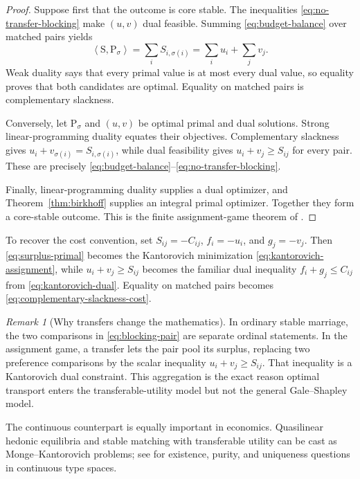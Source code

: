 \documentclass[11pt]{article}
\theoremstyle{definition}
\theoremstyle{remark}
\newtheorem{remark}[theorem]{Remark}
\newcommand{\Pmat}{\mathrm P}
\newcommand{\Smat}{\mathrm S}
\newcommand{\ip}[2]{\left\langle #1,#2\right\rangle}
\begin{document}
\begin{proof}
Suppose first that the outcome is core stable. The inequalities
\eqref{eq:no-transfer-blocking} make \((u,v)\) dual feasible. Summing
\eqref{eq:budget-balance} over matched pairs yields
\begin{equation}\label{eq:core-equal-values}
  \ip{\Smat}{\Pmat_\sigma}
  =\sum_i S_{i,\sigma(i)}
  =\sum_i u_i+\sum_jv_j.
\end{equation}
Weak duality says that every primal value is at most every dual value, so
equality proves that both candidates are optimal. Equality on matched pairs is
complementary slackness.

Conversely, let \(\Pmat_\sigma\) and \((u,v)\) be optimal primal and dual
solutions. Strong linear-programming duality equates their objectives.
Complementary slackness gives
\(u_i+v_{\sigma(i)}=S_{i,\sigma(i)}\), while dual feasibility gives
\(u_i+v_j\geq S_{ij}\) for every pair. These are precisely
\eqref{eq:budget-balance}--\eqref{eq:no-transfer-blocking}.

Finally, linear-programming duality supplies a dual optimizer, and
Theorem~\ref{thm:birkhoff} supplies an integral primal optimizer. Together they
form a core-stable outcome. This is the finite assignment-game theorem of
\citet{ShapleyShubik1971}.
\end{proof}

To recover the cost convention, set \(S_{ij}=-C_{ij}\), \(f_i=-u_i\), and
\(g_j=-v_j\). Then \eqref{eq:surplus-primal} becomes the Kantorovich
minimization \eqref{eq:kantorovich-assignment}, while
\(u_i+v_j\geq S_{ij}\) becomes the familiar dual inequality
\(f_i+g_j\leq C_{ij}\) from \eqref{eq:kantorovich-dual}. Equality on matched
pairs becomes \eqref{eq:complementary-slackness-cost}.

\begin{remark}[Why transfers change the mathematics]
In ordinary stable marriage, the two comparisons in
\eqref{eq:blocking-pair} are separate ordinal statements. In the assignment
game, a transfer lets the pair pool its surplus, replacing two preference
comparisons by the scalar inequality \(u_i+v_j\geq S_{ij}\). That inequality
is a Kantorovich dual constraint. This aggregation is the exact reason optimal
transport enters the transferable-utility model but not the general
Gale--Shapley model.
\end{remark}

The continuous counterpart is equally important in economics. Quasilinear
hedonic equilibria and stable matching with transferable utility can be cast as
Monge--Kantorovich problems; see \citet{ChiapporiMcCannNesheim2010} for
existence, purity, and uniqueness questions in continuous type spaces.
\end{document}
